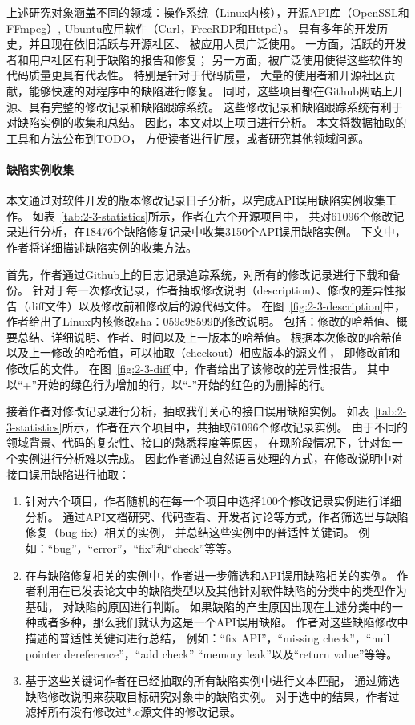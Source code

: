 上述研究对象涵盖不同的领域：操作系统（Linux内核），开源API库（OpenSSL和FFmpeg）,
Ubuntu应用软件（Curl，FreeRDP和Httpd）。
具有多年的开发历史，并且现在依旧活跃与开源社区、
被应用人员广泛使用。
一方面，活跃的开发者和用户社区有利于缺陷的报告和修复；
另一方面，被广泛使用使得这些软件的代码质量更具有代表性。
特别是针对于代码质量，
大量的使用者和开源社区贡献，能够快速的对程序中的缺陷进行修复。
同时，这些项目都在Github网站上开源、具有完整的修改记录和缺陷跟踪系统。
这些修改记录和缺陷跟踪系统有利于对缺陷实例的收集和总结。
因此，本文对以上项目进行分析。
本文将数据抽取的工具和方法公布到TODO，
方便读者进行扩展，或者研究其他领域问题。

\paragraph{缺陷实例收集}





本文通过对软件开发的版本修改记录日子分析，以完成API误用缺陷实例收集工作。
如表~\ref{tab:2-3-statistics}所示，作者在六个开源项目中，
共对61096个修改记录进行分析，在18476个缺陷修复记录中收集3150个API误用缺陷实例。
下文中，作者将详细描述缺陷实例的收集方法。

首先，作者通过Github上的日志记录追踪系统，对所有的修改记录进行下载和备份。
针对于每一次修改记录，作者抽取修改说明（description）、修改的差异性报告（diff文件）以及修改前和修改后的源代码文件。
在图~\ref{fig:2-3-description}中，作者给出了Linux内核修改sha：059c98599的修改说明。
包括：修改的哈希值、概要总结、详细说明、作者、时间以及上一版本的哈希值。
根据本次修改的哈希值以及上一修改的哈希值，可以抽取（checkout）相应版本的源文件，
即修改前和修改后的文件。
在图~\ref{fig:2-3-diff}中，作者给出了该修改的差异性报告。
其中以“+”开始的绿色行为增加的行，以“-”开始的红色的为删掉的行。

接着作者对修改记录进行分析，抽取我们关心的接口误用缺陷实例。
如表~\ref{tab:2-3-statistics}所示，作者在六个项目中，共抽取61096个修改记录实例。
由于不同的领域背景、代码的复杂性、接口的熟悉程度等原因，
在现阶段情况下，针对每一个实例进行分析难以完成。
因此作者通过自然语言处理的方式，在修改说明中对接口误用缺陷进行抽取：
\begin{enumerate}
	\item 针对六个项目，作者随机的在每一个项目中选择100个修改记录实例进行详细分析。
	通过API文档研究、代码查看、开发者讨论等方式，作者筛选出与缺陷修复（bug fix）相关的实例，
	并总结这些实例中的普适性关键词。
	例如：“bug”，“error”，“fix”和“check”等等。
	\item 在与缺陷修复相关的实例中，作者进一步筛选和API误用缺陷相关的实例。
	作者利用在已发表论文中的缺陷类型以及其他针对软件缺陷的分类中的类型作为基础，
	对缺陷的原因进行判断。
	如果缺陷的产生原因出现在上述分类中的一种或者多种，那么我们就认为这是一个API误用缺陷。
	作者对这些缺陷修改中描述的普适性关键词进行总结，
	例如：“fix API”，“missing check”，“null pointer dereference”，“add check” “memory leak”以及“return value”等等。
	\item 基于这些关键词作者在已经抽取的所有缺陷实例中进行文本匹配，
	通过筛选缺陷修改说明来获取目标研究对象中的缺陷实例。
	对于选中的结果，作者过滤掉所有没有修改过*.c源文件的修改记录。
\end{enumerate}

